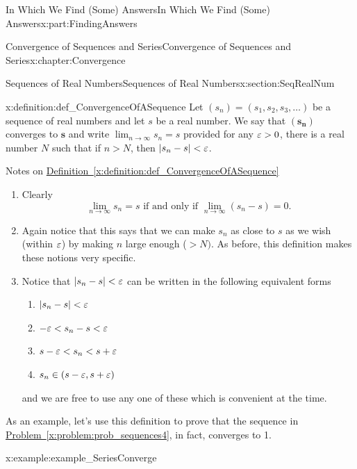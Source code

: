 \begin{partptx}{In Which We Find (Some) Answers}{}{In Which We Find (Some) Answers}{}{}{x:part:FindingAnswers}
\begin{chapterptx}{Convergence of Sequences and Series}{}{Convergence of Sequences and Series}{}{}{x:chapter:Convergence}
\begin{sectionptx}{Sequences of Real Numbers}{}{Sequences of Real Numbers}{}{}{x:section:SeqRealNum}
			\begin{definition}{}{x:definition:def_ConvergenceOfASequence}%
				 Let \(\left(s_n\right)=\left(s_1,s_2,s_3,\ldots\right)\) be a sequence of real numbers and let \(s\) be a real number. We say that \(\left(\boldsymbol{s}_{\boldsymbol{n}}\right)\) \textbraceleft{}converges to\textbraceright{} \(\boldsymbol{s}\) and write \(\lim_{n\rightarrow\infty}s_n=s\) provided for any \(\varepsilon>0\), there is a real number \(N\) such that if \(n>N\), then \(|s_n-s|< \varepsilon\).%
			\end{definition}
			\textbraceleft{}Notes on \hyperref[x:definition:def_ConvergenceOfASequence]{Definition~{\xreffont\ref{x:definition:def_ConvergenceOfASequence}}}\textbraceright{}%
			\par
			\begin{enumerate}
				\item{}Clearly%
				\begin{equation*}
					\lim_{n\rightarrow\infty}s_n=s \text{ if and only if } \lim_{n\rightarrow\infty}\left(s_n-s\right)=0\text{.}
				\end{equation*}
				\item{}Again notice that this says that we can make \(s_n\) as close to \(s\) as we wish (within \(\varepsilon\)) by making \(n\) large enough (\(>N)\). As before, this definition makes these notions very specific.%
				\item{}Notice that \(|s_n-s|< \varepsilon\) can be written in the following equivalent forms%
				\par
				\begin{enumerate}
					\item{}\(\displaystyle |s_n-s|< \varepsilon\)%
					\item{}\(\displaystyle -\varepsilon< s_n-s< \varepsilon\)%
					\item{}\(\displaystyle s-\varepsilon< s_n< s+\varepsilon\)%
					\item{}\(\displaystyle s_n\in\left(s-\varepsilon,s+\varepsilon\right)\)%
				\end{enumerate}
				\par
				and we are free to use any one of these which is convenient at the time.%
			\end{enumerate}
			\par
			As an example, let's use this definition to prove that the sequence in \hyperref[x:problem:prob_sequences4]{Problem~{\xreffont\ref{x:problem:prob_sequences4}}}, in fact, converges to 1.%
			\begin{example}{}{x:example:example_SeriesConverge}%

\end{example}
\end{sectionptx}
\end{chapterptx}
\end{partptx}
